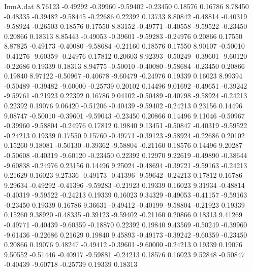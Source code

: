 \begin{filecontents}{ImuA.dat}
   8.76123   -0.49292   -0.39960   -9.59402   -0.23450    0.18576    0.16786
   8.78450   -0.48335   -0.39482   -9.58445   -0.22686    0.22392    0.13733
   8.80842   -0.48814   -0.40319   -9.58924   -0.26503    0.18576    0.17550
   8.83152   -0.49771   -0.40558   -9.59522   -0.23450    0.20866    0.18313
   8.85443   -0.49053   -0.39601   -9.59283   -0.24976    0.20866    0.17550
   8.87825   -0.49173   -0.40080   -9.58684   -0.21160    0.18576    0.17550
   8.90107   -0.50010   -0.41276   -9.60359   -0.24976    0.17812    0.20603
   8.92393   -0.50249   -0.39601   -9.60120   -0.22686    0.19339    0.18313
   8.94775   -0.50010   -0.40080   -9.58684   -0.23450    0.20866    0.19840
   8.97122   -0.50967   -0.40678   -9.60479   -0.24976    0.19339    0.16023
   8.99394   -0.50489   -0.39482   -9.60000   -0.25739    0.20102    0.14496
   9.01692   -0.49651   -0.39242   -9.59761   -0.21923    0.22392    0.16786
   9.04102   -0.50489   -0.40798   -9.58924   -0.24213    0.22392    0.19076
   9.06420   -0.51206   -0.40439   -9.59402   -0.24213    0.23156    0.14496
   9.08747   -0.50010   -0.39601   -9.59043   -0.23450    0.20866    0.14496
   9.11046   -0.50967   -0.39960   -9.58804   -0.24976    0.17812    0.19840
   9.13451   -0.50847   -0.40319   -9.59522   -0.24213    0.19339    0.17550
   9.15760   -0.49771   -0.39123   -9.58924   -0.22686    0.20102    0.15260
   9.18081   -0.50130   -0.39362   -9.58804   -0.21160    0.18576    0.14496
   9.20287   -0.50608   -0.40319   -9.60120   -0.23450    0.22392    0.12970
   9.22619   -0.49890   -0.38644   -9.60838   -0.24976    0.23156    0.14496
   9.25024   -0.48694   -0.39721   -9.59163   -0.24213    0.21629    0.16023
   9.27336   -0.49173   -0.41396   -9.59642   -0.24213    0.17812    0.16786
   9.29634   -0.49292   -0.41396   -9.59283   -0.21923    0.19339    0.16023
   9.31934   -0.48814   -0.40319   -9.59522   -0.24213    0.19339    0.16023
   9.34329   -0.49053   -0.41157   -9.59163   -0.23450    0.19339    0.16786
   9.36631   -0.49412   -0.40199   -9.58804   -0.21923    0.19339    0.15260
   9.38920   -0.48335   -0.39123   -9.59402   -0.21160    0.20866    0.18313
   9.41269   -0.49771   -0.40439   -9.60359   -0.18870    0.22392    0.19840
   9.43569   -0.50249   -0.39960   -9.61436   -0.22686    0.21629    0.19840
   9.45893   -0.49173   -0.39242   -9.60359   -0.23450    0.20866    0.19076
   9.48247   -0.49412   -0.39601   -9.60000   -0.24213    0.19339    0.19076
   9.50552   -0.51446   -0.40917   -9.59881   -0.24213    0.18576    0.16023
   9.52848   -0.50847   -0.40439   -9.60718   -0.25739    0.19339    0.18313

\end{filecontents}
